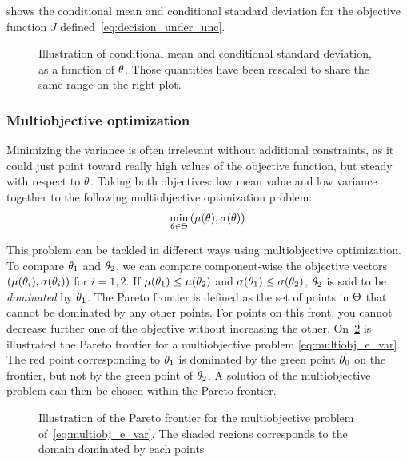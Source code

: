 \documentclass[../../Main_ManuscritThese.tex]{subfiles}
\newcommand\imgpath{/home/victor/acadwriting/Manuscrit/Text/Chapter3/img/}
\begin{document}
 shows the conditional mean and conditional
standard deviation for the objective function $J$
defined~\cref{eq:decision_under_unc}.
\begin{figure}[ht]
  \centering
  
  \caption[Conditional mean and standard deviation]{Illustration of
    conditional mean and conditional standard deviation, as a function
    of $\theta$. Those quantities have been rescaled to share the same
    range on the right plot.}
  \label{fig:mean_std} 
\end{figure}

\subsubsection{Multiobjective optimization}
\label{sec:multiobjective_optimization}
Minimizing the variance is often irrelevant without additional
constraints, as it could just point toward really high values of the
objective function, but steady with respect to $\theta$. Taking both
objectives: low mean value and low variance together to the following
multiobjective optimization problem:
\begin{align}
  \label{eq:multiobj_e_var}
  \min_{\theta\in\Theta} \left(\mu(\theta),\sigma(\theta)\right)
\end{align}


This problem can be tackled in different ways using multiobjective optimization.
To compare $\theta_1$ and $\theta_2$, we can compare component-wise the
objective vectors $(\mu(\theta_i),\sigma(\theta_i))$ for $i=1,2$. If
$\mu(\theta_1) \leq \mu(\theta_2)$ and $\sigma(\theta_1) \leq \sigma(\theta_2)$,
$\theta_2$ is said to be \emph{dominated} by $\theta_1$. The Pareto frontier
is defined as the set of points in $\Theta$ that cannot be dominated
by any other points. For points on this front, you cannot decrease
further one of the objective without increasing the other.
On~\cref{fig:pareto} is illustrated the Pareto frontier for a
multiobjective problem \cref{eq:multiobj_e_var}. The red point
corresponding to $\theta_1$ is dominated by the green point $\theta_0$ on
the frontier, but not by the green point of $\theta_2$. A solution of the
multiobjective problem can then be chosen within the Pareto frontier.

\begin{figure}[ht]
  \centering
  
  \caption[Pareto frontier]{\label{fig:pareto} 
 Illustration of the Pareto frontier for the multiobjective problem of~\cref{eq:multiobj_e_var}. The shaded regions corresponds to the domain dominated by each points}
\end{figure}
\end{document}
